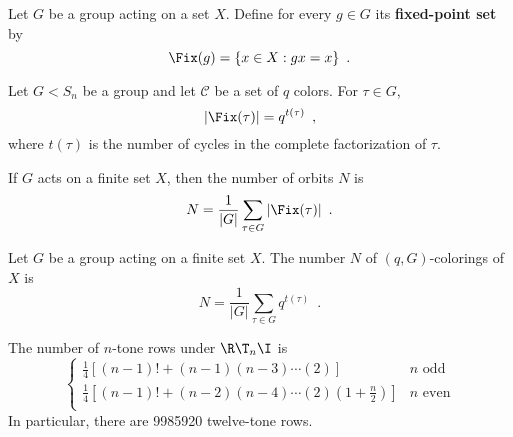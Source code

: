 \begin{definition}
	\cite[86]{Aigner2007}
	Let $G$ be a group acting on a set $X$. Define for every $g \in G$ its
	\textbf{fixed-point set} by 
	\begin{equation}
		\Fix(g) = \{ x \in X : gx = x \} \enspace.
	\end{equation}
\end{definition}

\begin{lemma}
	\cite[112]{Rotman1967}
	Let $G < S_n$ be a group and let $\mathcal{C}$ be a set of $q$ colors. For $\tau \in G$,
	\begin{equation}
		|\Fix(\tau)| = q^{t(\tau)} \enspace,
	\end{equation}
	where $t(\tau)$ is the number of cycles in the complete factorization of $\tau$.
\end{lemma}

\begin{lemma}[Burnside]
	\cite[109]{Rotman1967}
	\cite[251]{Tucker1974}
	If $G$ acts on a finite set $X$, then the number of orbits $N$ is
	\begin{equation}
		N = \frac{1}{|G|} \sum_{\tau \in G} |\Fix(\tau)| \enspace.
	\end{equation}
\end{lemma}

\begin{corollary}
	\cite[112]{Rotman1967}
	Let $G$ be a group acting on a finite set $X$. The number $N$ of $(q, G)$-colorings
	of $X$ is
	\begin{equation}
		N = \frac{1}{|G|} \sum_{\tau \in G} q^{t(\tau)} \enspace.
	\end{equation}
\end{corollary}

\begin{corollary}
	\cite[54]{Reiner1985}
	\cite[127]{FripertingerLackner2015}
	The number of $n$-tone rows under $\R \T_n \I$ is
	\begin{equation}
		\begin{cases}
			\frac{1}{4} \left[ (n - 1)! + (n - 1) (n - 3) \cdots (2) \right]
			& n \text{ odd} \\
			\frac{1}{4} \left[ (n - 1)! + (n - 2) (n - 4) \cdots (2) (1 + \frac{n}{2})
			\right] & n \text{ even} \\
		\end{cases}
	\end{equation}
	In particular, there are 9985920 twelve-tone rows.
\end{corollary}

